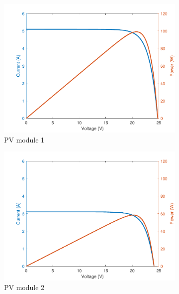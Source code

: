 \documentclass[conference]{IEEEtran}
\begin{document}
\begin{figure}[t]
     \centering
	 \begin{subfigure}[b]{0.3\linewidth}
        \centering
        \includegraphics[width=\linewidth]{PVSC-46/fig/m_1.pdf}
        \caption{PV module 1}
    \end{subfigure}
     \begin{subfigure}[b]{0.3\linewidth}
        \centering
        \includegraphics[width=\linewidth]{PVSC-46/fig/m_2.pdf}
        \caption{PV module 2}
     \end{subfigure}
	\begin{subfigure}[b]{0.3\linewidth}
        \centering

\end{subfigure}
\end{figure}
\end{document}
